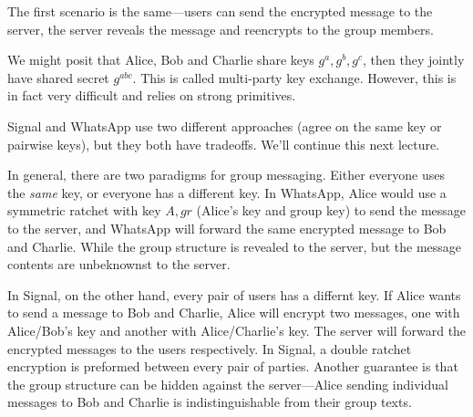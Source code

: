 The first scenario is the same---users can send the encrypted message to the server, the server reveals the message and reencrypts to the group members.

We might posit that Alice, Bob and Charlie share keys $g^a, g^b, g^c$, then they jointly have shared secret $g^{abc}$. This is called multi-party key exchange. However, this is in fact very difficult and relies on strong primitives.

Signal and WhatsApp use two different approaches (agree on the same key or pairwise keys), but they both have tradeoffs. We'll continue this next lecture.

In general, there are two paradigms for group messaging. Either everyone uses the \emph{same} key, or everyone has a different key. In WhatsApp, Alice would use a symmetric ratchet with key $A, gr$ (Alice's key and group key) to send the message to the server, and WhatsApp will forward the same encrypted message to Bob and Charlie. While the group structure is revealed to the server, but the message contents are unbeknownst to the server.


In Signal, on the other hand, every pair of users has a differnt key. If Alice wants to send a message to Bob and Charlie, Alice will encrypt two messages, one with Alice/Bob's key and another with Alice/Charlie's key. The server will forward the encrypted messages to the users respectively. In Signal, a double ratchet encryption is preformed between every pair of parties. Another guarantee is that the group structure can be hidden against the server---Alice sending individual messages to Bob and Charlie is indistinguishable from their group texts.

